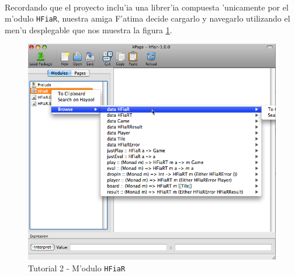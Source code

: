 \documentclass[a4paper]{article}
\begin{document}
\paragraph{}Recordando que el proyecto inclu'ia una librer'ia compuesta 'unicamente por el m'odulo \texttt{HFiaR}, nuestra amiga F'atima decide cargarlo y navegarlo utilizando el men'u desplegable que nos muestra la figura \ref{tut204}.
\begin{figure}[hp]
	\begin{center}
        	\includegraphics[width=.75\textwidth]{pictures/tut2/04}
		\caption{Tutorial 2 - M'odulo \texttt{HFiaR}}
		\label{tut204}
	\end{center}
\end{figure}
\end{document}
